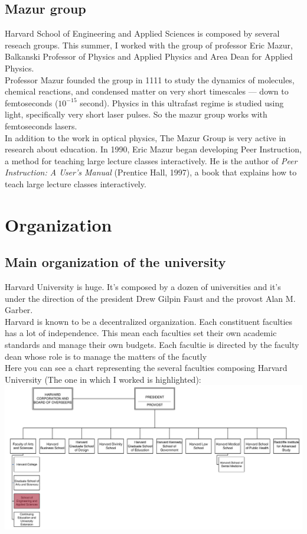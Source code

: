 \documentclass[10pt,a4paper]{article}
\newcommand{\hseas}{Harvard School of Engineering and Applied Sciences}
\begin{document}
\subsection{Mazur group}

\hseas{} is composed by several reseach groups. This summer, I worked with the group of professor Eric Mazur, Balkanski Professor of Physics and Applied Physics and Area Dean for Applied Physics.\\
Professor Mazur founded the group in 1111%
to study the dynamics of molecules, chemical reactions, and condensed matter on very short timescales — down to femtoseconds ($10^{-15}$ second). Physics in this ultrafast regime is studied using light, specifically very short laser pulses. So the mazur group works with femtoseconds lasers.\\
In addition to the work in optical physics, The Mazur Group is very active in research about education. In 1990, Eric Mazur began developing Peer Instruction, a method for teaching large lecture classes interactively. He is the author of \textit{Peer Instruction: A User's Manual} (Prentice Hall, 1997), a book that explains how to teach large lecture classes interactively.

\newpage
\section{Organization}
\subsection{Main organization of the university}
Harvard University is huge. It's composed by a dozen of universities and it's under the direction of the president Drew Gilpin Faust and the provost Alan M. Garber.\\

Harvard is known to be a decentralized organization. Each constituent faculties has a lot of independence. This mean each faculties set their own academic standards and manage their own budgets. Each facultie is directed by the faculty dean whose role is to manage the matters of the facutly\\

Here you can see a chart representing the several faculties composing Harvard University (The one in which I worked is highlighted):\\
\includegraphics[width=1\textwidth]{images/chart1.png}
\end{document}
